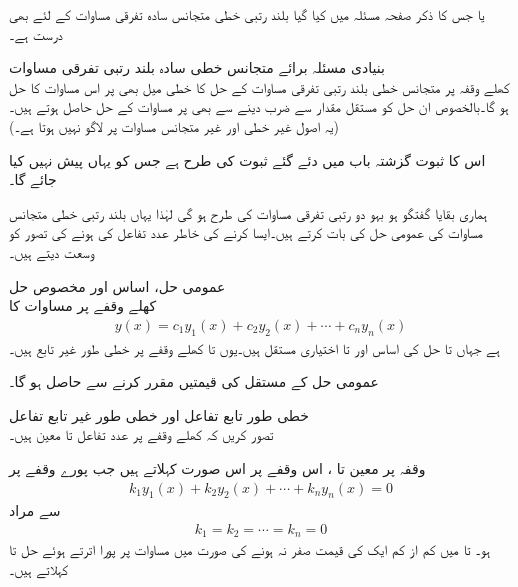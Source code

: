  یا  جس کا ذکر صفحہ  مسئلہ  میں کیا گیا بلند رتبی خطی متجانس سادہ تفرقی مساوات کے لئے بھی درست ہے۔

\quad بنیادی مسئلہ برائے متجانس خطی سادہ بلند رتبی تفرقی مساوات\\
کھلے وقفہ  پر متجانس خطی بلند رتبی تفرقی مساوات  کے حل کا خطی میل بھی  پر اس مساوات کا حل ہو گا۔بالخصوص ان حل کو مستقل مقدار سے ضرب دینے سے بھی  پر  مساوات کے حل حاصل ہوتے ہیں۔(یہ اصول غیر خطی اور  غیر متجانس مساوات پر لاگو نہیں ہوتا ہے۔)

اس کا ثبوت گزشتہ باب میں دئے گئے ثبوت کی طرح ہے جس کو یہاں پیش نہیں کیا جائے گا۔

ہماری بقایا گفتگو ہو بہو دو رتبی تفرقی مساوات کی طرح ہو گی لہٰذا یہاں بلند رتبی خطی متجانس مساوات کی عمومی حل کی بات کرتے ہیں۔ایسا کرنے کی خاطر  عدد تفاعل کی   ہونے کی تصور کو وسعت دیتے ہیں۔

\quad عمومی حل، اساس اور مخصوص حل\\
کھلے وقفے  پر مساوات  کا 
\begin{align}
y(x)=c_1y_1(x)+c_2y_2(x)+\cdots +c_ny_n(x)
\end{align}
ہے جہاں  تا  حل کی اساس اور  تا  اختیاری مستقل ہیں۔یوں  تا  کھلے وقفے پر خطی طور غیر تابع ہیں۔ 

عمومی حل کے مستقل کی قیمتیں مقرر کرنے سے  حاصل ہو گا۔

\quad خطی طور تابع تفاعل اور خطی طور غیر تابع تفاعل\\
تصور کریں کہ کھلے وقفے  پر   عدد تفاعل  تا  معین ہیں۔

 وقفہ  پر معین  تا ،  اس وقفے   پر اس صورت  کہلاتے ہیں جب پورے وقفے پر
\begin{align}\label{مساوات_سادہ_بلند_خطی_طور_غیر_تابع_الف}
k_1 y_1(x)+k_2 y_2(x)+\cdots+k_ny_n(x)=0
\end{align}
سے مراد 
\begin{align*}
k_1=k_2= \cdots =k_n=0 
\end{align*}
ہو۔ تا  میں  کم از کم ایک کی قیمت صفر نہ ہونے کی صورت میں مساوات  پر پورا اترتے ہوئے حل  تا   کہلاتے ہیں۔

